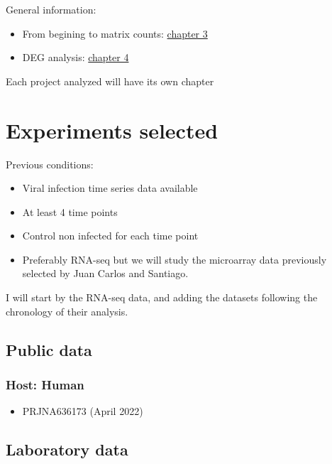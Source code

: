 \documentclass[
]{book}
\providecommand{\tightlist}{%
  \setlength{\itemsep}{0pt}\setlength{\parskip}{0pt}}
\begin{document}
General information:

\begin{itemize}
\tightlist
\item
  From begining to matrix counts: \protect\hyperlink{previous-steps}{chapter 3}\\
\item
  DEG analysis: \protect\hyperlink{deg-analysis}{chapter 4}
\end{itemize}

Each project analyzed will have its own chapter

\hypertarget{experiments}{%
\chapter{Experiments selected}\label{experiments}}

Previous conditions:

\begin{itemize}
\tightlist
\item
  Viral infection time series data available\\
\item
  At least 4 time points\\
\item
  Control non infected for each time point\\
\item
  Preferably RNA-seq but we will study the microarray data previously selected by Juan Carlos and Santiago.
\end{itemize}

I will start by the RNA-seq data, and adding the datasets following the chronology of their analysis.

\hypertarget{public-data}{%
\section{Public data}\label{public-data}}

\hypertarget{host-human}{%
\subsection{Host: Human}\label{host-human}}

\begin{itemize}
\tightlist
\item
  PRJNA636173 (April 2022)
\end{itemize}

\hypertarget{laboratory-data}{%
\section{Laboratory data}\label{laboratory-data}}
\end{document}
